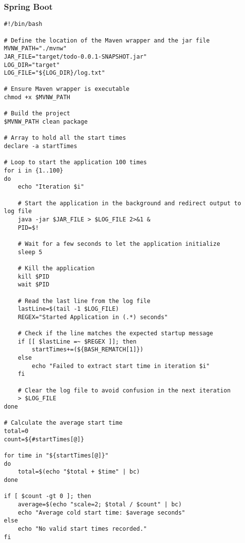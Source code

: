 \documentclass[a4paper]{article}
\begin{document}
\subsubsection{Spring Boot}
\begin{lstlisting}
#!/bin/bash

# Define the location of the Maven wrapper and the jar file
MVNW_PATH="./mvnw"
JAR_FILE="target/todo-0.0.1-SNAPSHOT.jar"
LOG_DIR="target"
LOG_FILE="${LOG_DIR}/log.txt"

# Ensure Maven wrapper is executable
chmod +x $MVNW_PATH

# Build the project
$MVNW_PATH clean package

# Array to hold all the start times
declare -a startTimes

# Loop to start the application 100 times
for i in {1..100}
do
	echo "Iteration $i"

	# Start the application in the background and redirect output to log file
	java -jar $JAR_FILE > $LOG_FILE 2>&1 &
	PID=$!

	# Wait for a few seconds to let the application initialize
	sleep 5

	# Kill the application
	kill $PID
	wait $PID

	# Read the last line from the log file
	lastLine=$(tail -1 $LOG_FILE)
	REGEX="Started Application in (.*) seconds"

	# Check if the line matches the expected startup message
	if [[ $lastLine =~ $REGEX ]]; then
		startTimes+=(${BASH_REMATCH[1]})
	else
		echo "Failed to extract start time in iteration $i"
	fi

	# Clear the log file to avoid confusion in the next iteration
	> $LOG_FILE
done

# Calculate the average start time
total=0
count=${#startTimes[@]}

for time in "${startTimes[@]}"
do
	total=$(echo "$total + $time" | bc)
done

if [ $count -gt 0 ]; then
	average=$(echo "scale=2; $total / $count" | bc)
	echo "Average cold start time: $average seconds"
else
	echo "No valid start times recorded."
fi
\end{lstlisting}
\end{document}
